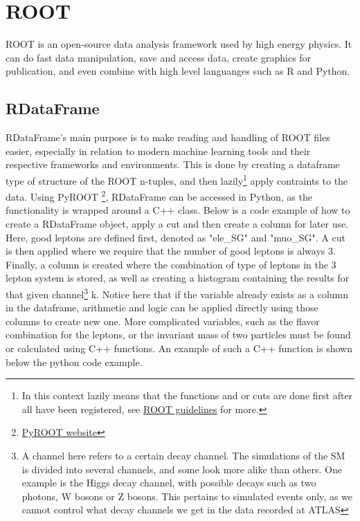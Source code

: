\section{ROOT}
ROOT is an open-source data analysis framework used by high energy physics. It can do fast data manipulation, save and access data, 
create graphics for publication, and even combine with high level languanges such as R and Python.


\subsection*{RDataFrame}
RDataFrame's main purpose is to make reading and handling of ROOT files easier, especially in 
relation to modern machine learning tools and their respective frameworks and environments. 
This is done by creating a dataframe type of structure of the ROOT n-tuples, and then 
lazily\footnote{In this context lazily means that the functions and or cuts are done first after 
all have been registered, see \href{https://root.cern/doc/master/classROOT_1_1RDataFrame.html}{ROOT 
guidelines} for more.} apply contraints to the data. Using PyROOT
\footnote{\href{https://root.cern/manual/python/}{PyROOT website}}, RDataFrame can be accessed in 
Python, as the functionality is wrapped around a C++ class. Below is a code example of how
to create a RDataFrame object, apply a cut and then create a column for later use. Here, good 
leptons are defined first, denoted as "ele\_SG" and "muo\_SG". A cut is then applied where we 
require that the number of good leptons is always 3. Finally, a column is created where the 
combination of type of leptons in the 3 lepton system is stored, as well as creating a histogram 
containing the results for that given channel\footnote{A channel here refers to a certain decay 
channel. The simulations of the SM is divided into several channels, and some look more alike than others. One example is 
the Higgs decay channel, with possible decays such as two photons, W bosons or Z bosons. This pertains 
to simulated events only, as we cannot control what decay channels we get in the data recorded at ATLAS} 
k. Notice here that if the variable already exists as a column in the dataframe, arithmetic and logic 
can be applied directly using those columns to create new one. More complicated variables, such as 
the flavor combination for the leptons, or the invariant mass of two particles must be found or 
calculated using C++ functions. An example of such a C++ function is shown below the python code example. 

